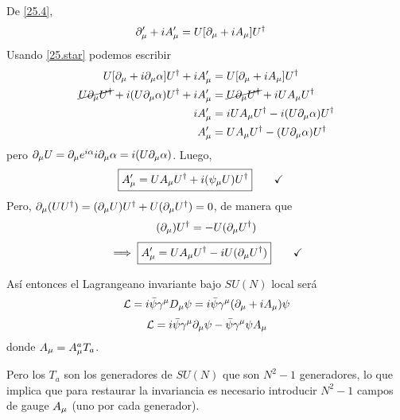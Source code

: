 \begin{prueba}
	De \eqref{25.4},
	\begin{align}
  \partial_\mu '+iA_\mu '&=U[\partial_\mu +iA_\mu ]U^\dagger
\end{align}
Usando \eqref{25.star} podemos escribir 
\begin{align}
  U[\partial_\mu +i\partial_\mu \alpha ]U^\dagger +iA_\mu'&=U[\partial_\mu +iA_\mu ]U^\dagger \\
  \cancel{U\partial_\mu U^\dagger} +i(U\partial_\mu \alpha )U^\dagger+iA_\mu'&=\cancel{U\partial_\mu U^\dagger} +iUA_\mu U^\dagger\\
  iA_\mu '&=iUA_\mu U^\dagger -i(U\partial_\mu \alpha )U^\dagger \\
  A_\mu '&=UA_\mu U^\dagger -(U\partial_\mu \alpha )U^\dagger
\end{align}
pero $\partial_\mu U=\partial_\mu e^{i\alpha }i\partial_\mu \alpha =i(U\partial_\mu \alpha )$. Luego,
\begin{align}
 \Aboxed{ A_\m '&=UA_\m U^\dagger +i(\psi_\m U)U^\dagger }\qquad \checkmark
\end{align}
Pero, $\partial_\mu (UU^\dagger)=(\partial_\mu U)U^\dagger +U(\partial_\mu U^\dagger)=0$, de manera que
\begin{align}
  (\partial_\mu )U^\dagger =-U(\partial_\mu U^\dagger)
\end{align}
\begin{equation}
 \implies \boxed{A_\mu '=UA_\mu U^\dagger -iU(\partial_\mu U^\dagger )}\qquad \checkmark
\end{equation}
\end{prueba}

Así entonces el Lagrangeano invariante bajo $SU(N)$ local será
\begin{equation}
  \mathcal{L}=i\bar{\psi}\gamma^\mu D_\mu \psi=i\bar{\psi}\gamma^\mu (\partial_\mu +iA_\mu )\psi
\end{equation}
\begin{equation}\label{25.6}
  \mathcal{L}=i\bar{\psi}\gamma^\mu \partial_\mu \psi-\bar{\psi}\gamma^\mu \psi A_\mu 
\end{equation}
donde $A_\mu =A_\mu ^{a}T_a$.

 Pero los $T_a$ son los generadores de $SU(N)$ que son $N^2-1$ generadores, lo que implica que para restaurar la invariancia es necesario introducir $N^2-1$ campos de gauge $A_\mu$ (uno por cada generador).
 
